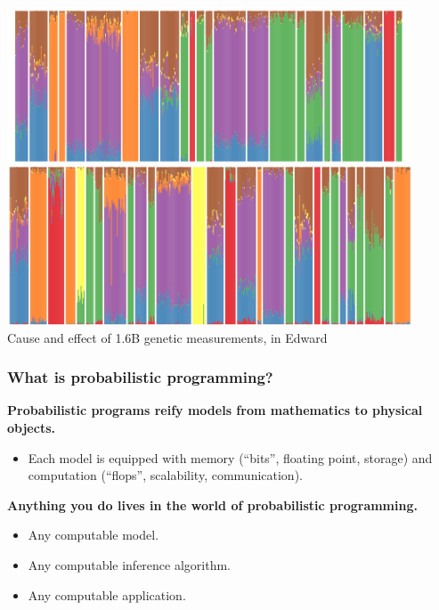 \documentclass[10pt,
               xcolor={usenames,dvipsnames},
               hyperref={colorlinks,linktoc=all,citecolor=Plum,linkcolor=MidnightBlue,urlcolor=MidnightBlue},noamssymb]{beamer}
\begin{document}
\begin{frame}[plain,t]
\begin{center}
\includegraphics[width=0.9\textwidth]{img/genetics.png}
\\[2ex]
Cause and effect of 1.6B genetic measurements, in Edward
\end{center}
\end{frame}

\begin{frame}
\frametitle{What is probabilistic programming?}
\textbf{Probabilistic programs reify models from mathematics to
physical objects.}
\begin{itemize}
\vspace{-2ex}
\item
Each model is equipped with memory (``bits'',
floating point, storage) and computation
(``flops'', scalability, communication).
\end{itemize}
\textbf{Anything you do lives in the world of probabilistic programming.}
\begin{itemize}
\item
Any computable model.

\item
Any computable inference algorithm.

\item
Any computable application.

\end{itemize}
\end{frame}
\end{document}
